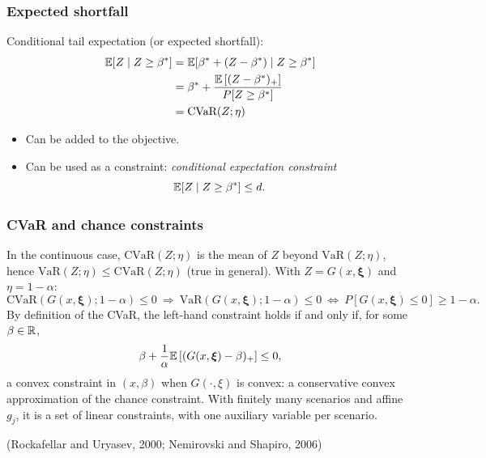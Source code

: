 \documentclass[aspectratio=169]{beamer}
\def\bxi{\boldsymbol\xi}
\begin{document}
\begin{frame}
\frametitle{Expected shortfall}

Conditional tail expectation (or expected shortfall):
\begin{align*}
{\mathbb{E}}[Z \mid Z \geq \beta^* ]
&= {\mathbb{E}}[\beta^* + (Z - \beta^*) \mid Z \geq \beta^*] \\
&= \beta^* + \frac{{\mathbb{E}}\left[(Z - \beta^*)_+\right]}{P[Z \geq \beta^*]} \\
&= \text{CVaR}(Z; \eta)
\end{align*}

\begin{itemize}
	\item Can be added to the objective.
	\item Can be used as a constraint: \textit{conditional expectation constraint}
	\[
	{\mathbb{E}}[Z \mid Z \geq \beta^*] \leq d.
	\]
\end{itemize}

\end{frame}

\begin{frame}
\frametitle{CVaR and chance constraints}

In the continuous case, $\text{CVaR}(Z;\eta)$ is the mean of $Z$ beyond $\text{VaR}(Z;\eta)$, hence $\text{VaR}(Z;\eta) \leq \text{CVaR}(Z;\eta)$ (true in general).
With $Z = G(x,\bxi)$ and $\eta = 1-\alpha$:
\[
\text{CVaR}(G(x,\bxi); 1-\alpha) \leq 0
\ \Longrightarrow\
\text{VaR}(G(x,\bxi); 1-\alpha) \leq 0
\ \Longleftrightarrow\
P[G(x,\bxi) \leq 0] \geq 1-\alpha.
\]
By definition of the CVaR, the left-hand constraint holds if and only if, for some $\beta \in {\mathbb{R}}$,
\[
\beta + \frac{1}{\alpha} \EE\left[ (G(x,\bxi) - \beta)_+ \right] \leq 0,
\]
{\red a convex constraint in $(x, \beta)$} when $G(\cdot,\xi)$ is convex: a conservative convex approximation of the chance constraint.
With finitely many scenarios and affine $g_j$, it is a set of linear constraints, with one auxiliary variable per scenario.

\smallskip

{\footnotesize (Rockafellar and Uryasev, 2000; Nemirovski and Shapiro, 2006)}

\end{frame}
\end{document}
